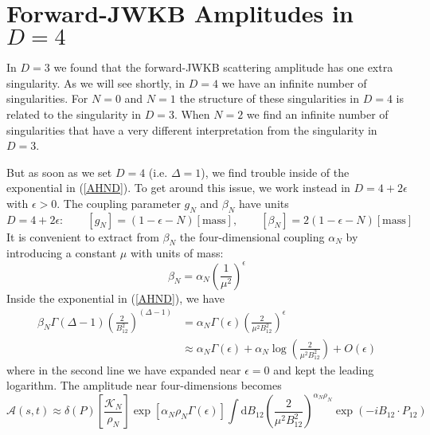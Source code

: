 \section{Forward-JWKB Amplitudes in $D = 4$\label{sec5}}
In $D = 3$ we found that the forward-JWKB scattering amplitude has one extra singularity. As we will see shortly, in $D = 4$ we have an infinite number of singularities. For $N = 0$ and $N = 1$ the structure of these singularities in $D = 4$ is related to the singularity in $D = 3$. When $N = 2$ we find an infinite number of singularities that have a very different interpretation from the singularity in $D = 3$.

But as soon as we set $D = 4$ (i.e. $\Delta = 1$), we find trouble inside of the exponential in (\ref{AHND}). To get around this issue, we work instead in $D = 4 + 2 \epsilon$ with $\epsilon > 0$. The coupling parameter $g_{N}$ and $\beta_{N}$ have units
\begin{equation}
	D = 4 + 2 \epsilon: \qquad [g_{N}] = \left( 1 - \epsilon - N \right) [\text{mass}], \qquad [\beta_{N}] = 2 \left( 1 - \epsilon - N \right) [\text{mass}]
\end{equation}
It is convenient to extract from $\beta_{N}$ the four-dimensional coupling $\alpha_{N}$ by introducing a constant $\mu$ with units of mass:
\begin{equation}
	\beta_{N} = \alpha_{N} \left( \frac{1}{\mu^{2}} \right)^{\epsilon}
\end{equation}
Inside the exponential in (\ref{AHND}), we have
\begin{align}
	\beta_{N} \Gamma(\Delta - 1) \left( \frac{2}{B_{12}^{2}} \right)^{(\Delta - 1)} &= \alpha_{N} \Gamma(\epsilon) \left( \frac{2}{\mu^{2} B_{12}^{2}} \right)^{\epsilon} \nonumber \\
	&\approx \alpha_{N} \Gamma(\epsilon) + \alpha_{N} \log{\left( \frac{2}{\mu^{2} B_{12}^{2}} \right)} + O(\epsilon)
\end{align}
where in the second line we have expanded near $\epsilon = 0$ and kept the leading logarithm. The amplitude near four-dimensions becomes
\begin{equation}
	\mathcal{A}(s, t) \approx \delta(P) \left[ \frac{\mathcal{K}_{N}}{\rho_{N}} \right] \exp{\left[ \alpha_{N} \rho_{N} \Gamma(\epsilon) \right]} \int \mathrm{d}B_{12} \left( \frac{2}{\mu^{2} B_{12}^{2}} \right)^{\alpha_{N} \rho_{N}} \exp{\left( - i B_{12} \cdot P_{12} \right)}
\end{equation}
